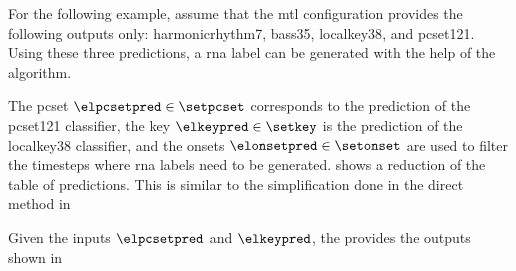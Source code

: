 
For the following example, assume that the \gls{mtl}
configuration provides the following outputs only:
\gls{harmonicrhythm7}, \gls{bass35},  \gls{localkey38}, and
\gls{pcset121}. Using these three predictions, a \gls{rna}
label can be generated with the help of the \algorithmrn{}
algorithm.

The \gls{pcset} $\elpcsetpred \in \setpcset$ corresponds to
the prediction of the \gls{pcset121} classifier, the key
$\elkeypred \in \setkey$ is the prediction of the
\gls{localkey38} classifier, and the onsets $\elonsetpred
\in \setonset$ are used to filter the timesteps where
\gls{rna} labels need to be generated.
 shows a reduction of the
table of predictions. This is similar to the simplification
done in the direct method in



Given the inputs $\elpcsetpred$ and $\elkeypred$, the
\algorithmrn{} provides the outputs shown in
